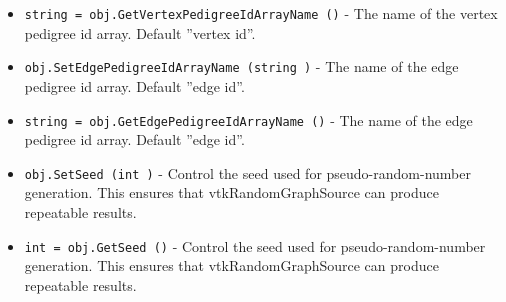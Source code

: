 \begin{itemize}
\item  \verb|string = obj.GetVertexPedigreeIdArrayName ()| -  The name of the vertex pedigree id array. Default ''vertex id''.

\item  \verb|obj.SetEdgePedigreeIdArrayName (string )| -  The name of the edge pedigree id array. Default ''edge id''.

\item  \verb|string = obj.GetEdgePedigreeIdArrayName ()| -  The name of the edge pedigree id array. Default ''edge id''.

\item  \verb|obj.SetSeed (int )| -  Control the seed used for pseudo-random-number generation.
 This ensures that vtkRandomGraphSource can produce repeatable
 results.

\item  \verb|int = obj.GetSeed ()| -  Control the seed used for pseudo-random-number generation.
 This ensures that vtkRandomGraphSource can produce repeatable
 results.

\end{itemize}
